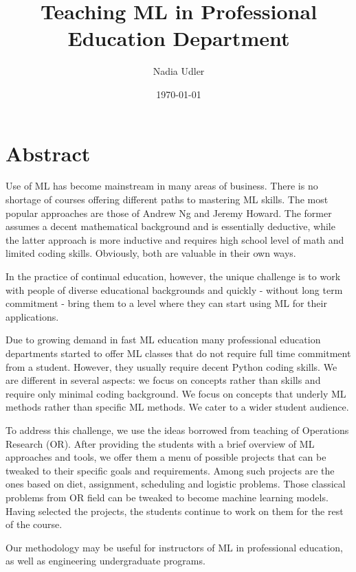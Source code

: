 \documentclass{article} %
\title{Teaching ML in Professional Education Department} %
\author{Nadia Udler} %
\date{\today} %
\begin{document}
    \maketitle %
    
    \section{Abstract} %
    
      Use of ML has become mainstream in many areas of business. There is no shortage of courses offering different paths to mastering ML skills. The most popular approaches are those of Andrew Ng and Jeremy Howard. The former assumes a decent mathematical background and is essentially deductive, while the latter approach is more inductive and requires high school level of math and limited coding skills. Obviously, both are valuable in their own ways.
  
 In the practice of continual education, however, the unique challenge is to work with people of diverse educational backgrounds and quickly - without long term commitment - bring them to a level where they can start using ML for their applications.
  
 Due to growing demand in fast ML education many professional education departments started to offer ML classes that do not require full time commitment from a student. However, they usually require decent Python coding skills. We are different in several aspects: we focus on concepts rather than skills and require only minimal coding background. We focus on concepts that underly ML methods rather than specific ML methods. We cater to a wider student audience.
  
 To address this challenge, we use the ideas borrowed from teaching of Operations Research (OR). After providing the students with a brief overview of ML approaches and tools, we offer them a menu of possible projects that can be tweaked to their specific goals and requirements. Among such projects are the ones based on diet, assignment, scheduling and logistic problems. Those classical problems from OR field can be tweaked to become machine learning models. Having selected the projects, the students continue to work on them for the rest of the course.
  
 Our methodology may be useful for instructors of ML in professional education, as well as engineering undergraduate programs.
\end{document}
